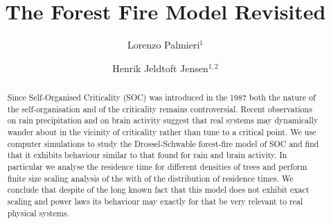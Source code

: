 \documentclass[aps,prl,showpacs,superscriptaddress,groupedaddress,notitlepage]{revtex4-1}
\begin{document}
\title[The Forest Fire Model Revisited]{The Forest Fire Model Revisited}

\author{Lorenzo Palmieri$^{1}$} 
\author{Henrik Jeldtoft Jensen$^{1,2}$}



\begin{abstract}
Since  Self-Organised Criticality (SOC) was introduced in the 1987 both the nature of the self-organisation and of the criticality remains controversial. Recent observations on rain precipitation and on brain activity suggest that real systems may dynamically wander about in the vicinity of criticality rather than tune to a critical point. We use computer simulations to study the  Drossel-Schwable forest-fire model of SOC and find that it exhibits behaviour  similar to  that found for rain and brain activity.  In particular we analyse the residence time for different densities of trees and perform finite size scaling analysis of the with of the distribution of residence times.  We conclude that despite of the long known fact that this model does not exhibit exact scaling and power laws its behaviour may exactly for that be very relevant to real physical systems.
\end{abstract}





\maketitle

\end{document}
